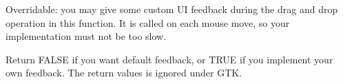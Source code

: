 \label{wxdropsourcegivefeedback}


Overridable: you may give some custom UI feedback during the drag and drop operation
in this function. It is called on each mouse move, so your implementation must not be too
slow.





Return FALSE if you want default feedback, or TRUE if you implement your own
feedback. The return values is ignored under GTK.

